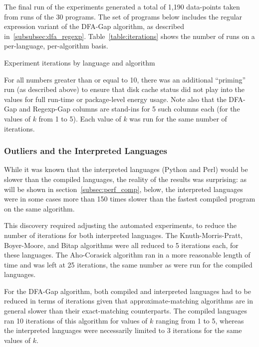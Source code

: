 The final run of the experiments generated a total of 1,190 data-points taken from runs of the 30 programs. The set of programs below includes the regular expression variant of the DFA-Gap algorithm, as described in~\ref{subsubsec:dfa_regexp}. Table~\ref{table:iterations} shows the number of runs on a per-language, per-algorithm basis.

\begin{table}[h!]
\begin{center}

\caption{Experiment iterations by language and algorithm}
\label{table:iterations}
\end{center}
\end{table}

For all numbers greater than or equal to 10, there was an additional ``priming'' run (as described above) to ensure that disk cache status did not play into the values for full run-time or package-level energy usage. Note also that the DFA-Gap and Regexp-Gap columns are stand-ins for 5 such columns each (for the values of $k$ from 1 to 5). Each value of $k$ was run for the same number of iterations.

\subsubsection{Outliers and the Interpreted Languages}

While it was known that the interpreted languages (Python and Perl) would be slower than the compiled languages, the reality of the results was surprising: as will be shown in section~\ref{subsec:perf_comp}, below, the interpreted languages were in some cases more than 150 times slower than the fastest compiled program on the same algorithm.

This discovery required adjusting the automated experiments, to reduce the number of iterations for both interpreted languages. The Knuth-Morris-Pratt, Boyer-Moore, and Bitap algorithms were all reduced to 5 iterations each, for these languages. The Aho-Corasick algorithm ran in a more reasonable length of time and was left at 25 iterations, the same number as were run for the compiled languages.

For the DFA-Gap algorithm, both compiled and interpreted languages had to be reduced in terms of iterations given that approximate-matching algorithms are in general slower than their exact-matching counterparts. The compiled languages ran 10 iterations of this algorithm for values of $k$ ranging from 1 to 5, whereas the interpreted languages were necessarily limited to 3 iterations for the same values of $k$.


